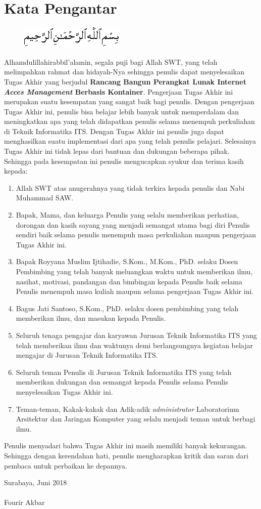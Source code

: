 \chapter{Kata Pengantar}
		\begin{figure}[h]
			\centering
			\includegraphics[width=0.5\linewidth]{img/bismillah.png}
		\end{figure}

		Alhamdulillahirabbil’alamin, segala puji bagi Allah SWT, yang telah melimpahkan rahmat dan hidayah-Nya sehingga penulis dapat menyelesaikan Tugas Akhir yang berjudul \textbf{Rancang Bangun Perangkat Lunak Internet \textit{Acces Management} Berbasis Kontainer}. Pengerjaan Tugas Akhir ini merupakan suatu kesempatan yang sangat baik bagi penulis. Dengan pengerjaan Tugas Akhir ini, penulis bisa belajar lebih banyak untuk memperdalam dan meningkatkan apa yang telah didapatkan penulis selama menempuh perkuliahan di Teknik Informatika ITS. Dengan Tugas Akhir ini penulis juga dapat menghasilkan suatu implementasi dari apa yang telah penulis pelajari.
		Selesainya Tugas Akhir ini tidak lepas dari bantuan dan dukungan beberapa pihak. Sehingga pada kesempatan ini penulis mengucapkan syukur dan terima kasih kepada:
		\begin{enumerate}
			\item Allah SWT atas anugerahnya yang tidak terkira kepada penulis dan Nabi Muhammad SAW.
			\item Bapak, Mama, dan keluarga Penulis yang selalu memberikan perhatian, dorongan dan kasih sayang yang menjadi semangat utama bagi diri Penulis sendiri baik selama penulis menempuh masa perkuliahan maupun pengerjaan Tugas Akhir ini.
			\item Bapak Royyana Muslim Ijtihadie, S.Kom., M.Kom., PhD. selaku Dosen Pembimbing yang telah banyak meluangkan waktu untuk memberikan ilmu, nasihat, motivasi, pandangan dan bimbingan kepada Penulis baik selama Penulis menempuh masa kuliah maupun selama pengerjaan Tugas Akhir ini.
			\item Bagus Jati Santoso, S.Kom., PhD. selaku dosen pembimbing yang telah memberikan ilmu, dan masukan kepada Penulis.
			\item Seluruh tenaga pengajar dan karyawan Jurusan Teknik Informatika ITS yang telah memberikan ilmu dan waktunya demi berlangsungnya kegiatan belajar mengajar di Jurusan Teknik Informatika ITS.
			\item Seluruh teman Penulis di Jurusan Teknik Informatika ITS yang telah memberikan dukungan dan semangat kepada Penulis selama Penulis menyelesaikan Tugas Akhir ini.
			\item Teman-teman, Kakak-kakak dan Adik-adik \textit{administrator} Laboratorium Arsitektur dan Jaringan Komputer yang selalu menjadi teman untuk berbagi ilmu.
		\end{enumerate}

		Penulis menyadari bahwa Tugas Akhir ini masih memiliki banyak kekurangan. Sehingga dengan kerendahan hati, penulis mengharapkan kritik dan saran dari pembaca untuk perbaikan ke depannya.

		\hfill Surabaya, Juni 2018 \\ \\
		\hfill Fourir Akbar